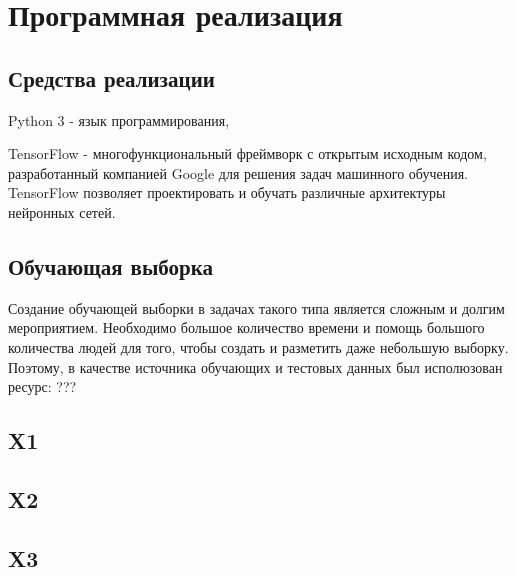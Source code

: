 \section{Программная реализация}
\subsection{Средства реализации}
Python 3 - язык программирования, 

TensorFlow - многофункциональный фреймворк с открытым исходным кодом, разработанный компанией Google для решения задач машинного обучения. TensorFlow позволяет проектировать и обучать различные архитектуры нейронных сетей.

\subsection{Обучающая выборка}
Создание обучающей выборки в задачах такого типа является сложным
и долгим мероприятием. Необходимо большое количество времени и помощь
большого количества людей для того, чтобы создать и разметить
даже небольшую выборку.
Поэтому, в качестве источника обучающих и тестовых данных был исполюзован ресурс: ???

\subsection{X1}

\subsection{X2}

\subsection{X3}


\clearpage